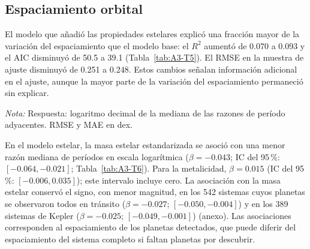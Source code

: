 \subsection{Espaciamiento orbital}
\label{sec:res-espaciamiento}

El modelo que añadió las propiedades estelares explicó una fracción mayor de la variación del espaciamiento que el modelo base: el $R^2$ aumentó de 0.070 a 0.093 y el AIC disminuyó de 50.5 a 39.1 (Tabla~\ref{tab:A3-T5}). El RMSE en la muestra de ajuste disminuyó de 0.251 a 0.248. Estos cambios señalan información adicional en el ajuste, aunque la mayor parte de la variación del espaciamiento permaneció sin explicar.

\begin{table}[htbp]
    \centering
    \caption{Análisis III: comparación de los modelos lineales del espaciamiento orbital. Diferencias respecto al modelo base S0.}
    \label{tab:A3-T5}
    \small
    \par\smallskip
    {\footnotesize\textit{Nota:} Respuesta: logaritmo decimal de la mediana de las razones de período adyacentes. RMSE y MAE en dex.}
\end{table}

En el modelo estelar, la masa estelar estandarizada se asoció con una menor razón mediana de períodos en escala logarítmica ($\beta=-0.043$; IC del 95\,\%: $[-0.064,-0.021]$; Tabla~\ref{tab:A3-T6}). Para la metalicidad, $\beta=0.015$ (IC del 95\,\%: $[-0.006,0.035]$); este intervalo incluye cero. La asociación con la masa estelar conservó el signo, con menor magnitud, en los 542 sistemas cuyos planetas se observaron todos en tránsito ($\beta=-0.027$; $[-0.050,-0.004]$) y en los 389 sistemas de Kepler ($\beta=-0.025$; $[-0.049,-0.001]$) (anexo). Las asociaciones corresponden al espaciamiento de los planetas detectados, que puede diferir del espaciamiento del sistema completo si faltan planetas por descubrir.

